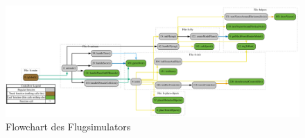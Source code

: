 \begin{figure}[H]
  \centering
  \includegraphics[width=1\textwidth]{images/flowchart/flight-simulator.pdf}
  \caption{Flowchart des Flugsimulators}
  \label{fig:FlowchartFlightSim}
\end{figure}\noindent